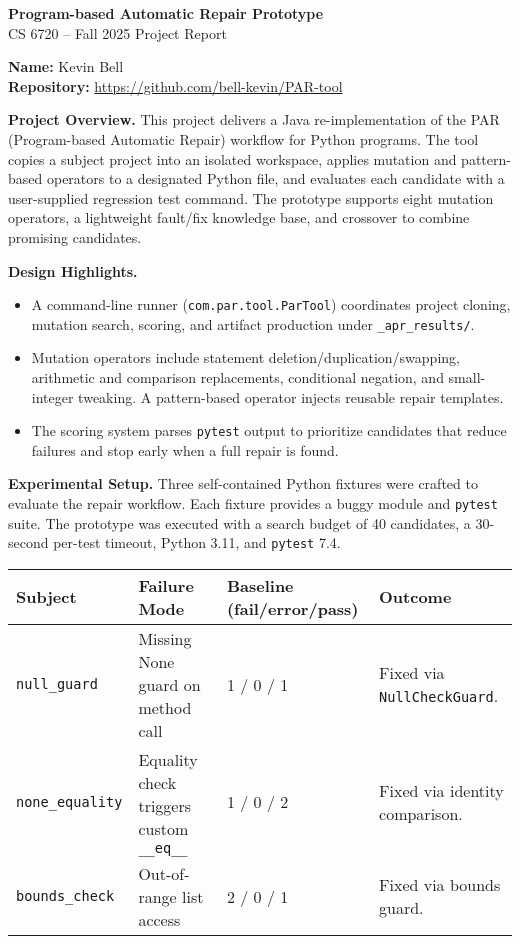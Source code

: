 \documentclass[11pt]{article}
\begin{document}
\begin{center}
  {\LARGE\bfseries Program-based Automatic Repair Prototype}\\[0.5em]
  {CS 6720 -- Fall 2025 Project Report}
\end{center}

\textbf{Name:} Kevin Bell \\
\textbf{Repository:} \href{https://github.com/bell-kevin/PAR-tool}{https://github.com/bell-kevin/PAR-tool}

\textbf{Project Overview.} This project delivers a Java re-implementation of the PAR (Program-based Automatic Repair) workflow for Python programs. The tool copies a subject project into an isolated workspace, applies mutation and pattern-based operators to a designated Python file, and evaluates each candidate with a user-supplied regression test command. The prototype supports eight mutation operators, a lightweight fault/fix knowledge base, and crossover to combine promising candidates.

\textbf{Design Highlights.}
\begin{itemize}[leftmargin=1.25em]
  \item A command-line runner (\texttt{com.par.tool.ParTool}) coordinates project cloning, mutation search, scoring, and artifact production under \texttt{\_apr\_results/}.
  \item Mutation operators include statement deletion/duplication/swapping, arithmetic and comparison replacements, conditional negation, and small-integer tweaking. A pattern-based operator injects reusable repair templates.
  \item The scoring system parses \texttt{pytest} output to prioritize candidates that reduce failures and stop early when a full repair is found.
\end{itemize}

\textbf{Experimental Setup.} Three self-contained Python fixtures were crafted to evaluate the repair workflow. Each fixture provides a buggy module and \texttt{pytest} suite. The prototype was executed with a search budget of 40 candidates, a 30-second per-test timeout, Python 3.11, and \texttt{pytest} 7.4.

\begin{table}[h]
  \centering
  \begin{tabularx}{\textwidth}{@{}lYYY@{}}
    \toprule
    Subject & Failure Mode & Baseline (fail/error/pass) & Outcome \\
    \midrule
    \texttt{null\_guard} & Missing None guard on method call & 1 / 0 / 1 & Fixed via \texttt{NullCheckGuard}. \\
    \texttt{none\_equality} & Equality check triggers custom \texttt{\_\_eq\_\_} & 1 / 0 / 2 & Fixed via identity comparison. \\
    \texttt{bounds\_check} & Out-of-range list access & 2 / 0 / 1 & Fixed via bounds guard. \\
    \bottomrule
  \end{tabularx}
\end{table}
\end{document}
